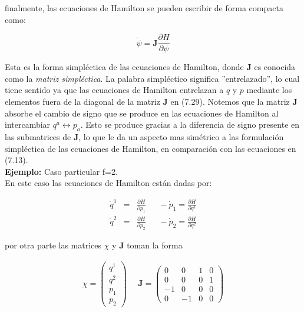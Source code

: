 \documentclass[12pt]{report}
\begin{document}
finalmente, las ecuaciones de Hamilton se pueden escribir de forma compacta como:

\begin{equation}
\dot{\psi}  = \textbf{J} \frac{\partial H}{\partial \psi}
\end{equation} 


Esta es la forma simpléctica de las ecuaciones de Hamilton, donde $\textbf{J}$ es conocida como la \textit{matriz simpléctica}. La palabra simpléctico significa ''entrelazado'', lo cual tiene sentido ya que las ecuaciones de Hamilton entrelazan a $q$ y $p$ mediante los elementos fuera de la diagonal de la matriz $\textbf{J}$ en (7.29). Notemos que la matriz $\textbf{J}$ absorbe el cambio de signo que se produce en las ecuaciones de Hamilton al intercambiar $q^a \leftrightarrow p_a$. Esto se produce gracias a la diferencia de signo presente en las submatrices de $\textbf{J}$, lo que le da un aspecto mas simétrico a las formulación simpléctica de las ecuaciones de Hamilton, en comparación con las ecuaciones en (7.13). \\

\textbf{Ejemplo:} Caso particular f=2. \\

En este caso las ecuaciones de Hamilton están dadas por:

\begin{eqnarray}
\dot{q}^1&=&\frac{\partial H}{\partial p_1} \ \ \ \ \ \ \ -\dot{p}_1 =\frac{\partial H}{\partial q^1}   \\
\dot{q}^2&=&\frac{\partial H}{\partial p_2}  \ \ \ \ \ \ \
-\dot{p}_2 =\frac{\partial H}{\partial q^2} 
\end{eqnarray}

por otra parte las matrices $\chi$ y $\textbf{J}$ toman la forma


\begin{eqnarray} 
\chi=\left( 
\begin{array}{c} \nonumber
q^1    \\
q^2    \\ 
p_1 \\
p_2
\end{array}
\right) \ \ \ \ \ \
\textbf{J}=\left( 
\begin{array}{cccc} \nonumber
0 & 0 & 1 & 0  \\
0 & 0 & 0 & 1  \\
-1 & 0 & 0 & 0 \\
0 & -1 & 0 & 0
\end{array}
\right)
\end{eqnarray}
\end{document}
